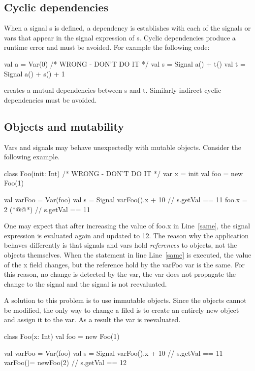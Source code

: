 \documentclass[10pt,a4paper]{article}
\newcommand{\code}[1]{{\fontfamily{cmtt}\small\selectfont#1}}
\begin{document}
\subsection{Cyclic dependencies} When a signal \code{s} is defined, a
dependency is establishes with each of the signals or vars that appear
in the signal expression of \code{s}. Cyclic dependencies produce a
runtime error and must be avoided. For example the following code:

\begin{codenv}
val a = Var(0)             /* WRONG - DON'T DO IT */
val s = Signal{ a() + t() }
val t = Signal{ a() + s() + 1 }
\end{codenv}

creates a mutual dependencies between \code{s} and \code{t}. Similarly
indirect cyclic dependencies must be avoided.



\subsection{Objects and mutability} Vars and signals may behave
unexpectedly with mutable objects. Consider the following example.

\begin{codenv}
class Foo(init: Int){            /* WRONG - DON'T DO IT */
  var x = init
}
val foo = new Foo(1)

val varFoo = Var(foo)           
val s = Signal{ varFoo().x + 10 }
// s.getVal == 11
foo.x = 2 (*@\label{same}@*)
// s.getVal == 11 
\end{codenv}

One may expect that after increasing the value of \code{foo.x} in
Line~\ref{same}, the signal expression is evaluated again and updated
to 12. The reason why the application behaves differently is that
signals and vars hold {\it references} to objects, not the objects
themselves. When the statement in line Line~\ref{same} is executed,
the value of the \code{x} field changes, but the reference hold by the
\code{varFoo} var is the same. For this reason, no change is detected
by the var, the var does not propagate the change to the signal and
the signal is not reevaluated.

A solution to this problem is to use immutable objects. Since the
objects cannot be modified, the only way to change a filed is to
create an entirely new object and assign it to the var. As a result
the var is reevaluated.

\begin{codenv}
class Foo(x: Int){}
val foo = new Foo(1)

val varFoo = Var(foo)           
val s = Signal{ varFoo().x + 10 }
// s.getVal == 11
varFoo()= newFoo(2)
// s.getVal == 12 
\end{codenv}
\end{document}
